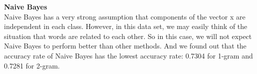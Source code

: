\textbf{Naive Bayes}\\
Naive Bayes has a very strong assumption that components of the vector x are independent in each class. However, in this data set, we may easily think of the situation that words are related to each other. So in this case, we will not expect Naive Bayes to perform better than other methods. And we found out that the accuracy rate of Naive Bayes has the lowest accuracy rate: 0.7304 for 1-gram and 0.7281 for 2-gram. 